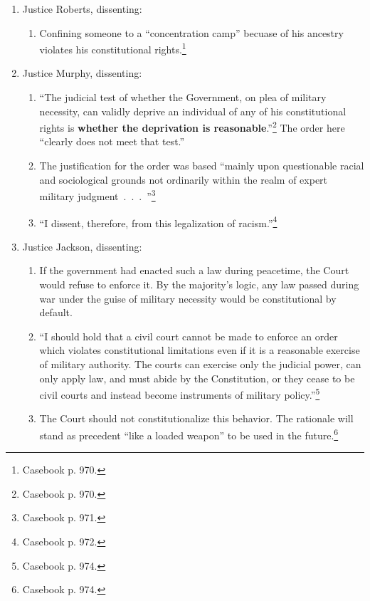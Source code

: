 \begin{enumerate}
    \begin{enumerate}
        \item ``~.~.~.~the validity of action under the war power must be 
        judged wholly in the context of war.''\footnote{Casebook p. 969.}
    \end{enumerate}
    \item Justice Roberts, dissenting:
    \begin{enumerate}
        \item Confining someone to a ``concentration camp'' becuase of his 
        ancestry violates his constitutional rights.\footnote{Casebook p. 
        970.}
    \end{enumerate}
    \item Justice Murphy, dissenting:
    \begin{enumerate}
        \item ``The judicial test of whether the Government, on plea of 
        military necessity, can validly deprive an individual of any of 
        his constitutional rights is \textbf{whether the deprivation is 
        reasonable}.''\footnote{Casebook p. 970.} The order here ``clearly 
        does not meet that test.''
        \item The justification for the order was based ``mainly upon 
        questionable racial and sociological grounds not ordinarily within 
        the realm of expert military judgment~.~.~.~''\footnote{Casebook 
        p. 971.}
        \item ``I dissent, therefore, from this legalization of 
        racism.''\footnote{Casebook p. 972.}
    \end{enumerate}
    \item Justice Jackson, dissenting:
    \begin{enumerate}
        \item If the government had enacted such a law during peacetime, 
        the Court would refuse to enforce it. By the majority's logic, any 
        law passed during war under the guise of military necessity would 
        be constitutional by default.
        \item ``I should hold that a civil court cannot be made to enforce 
        an order which violates constitutional limitations even if it is a 
        reasonable exercise of military authority. The courts can exercise 
        only the judicial power, can only apply law, and must abide by the 
        Constitution, or they cease to be civil courts and instead become 
        instruments of military policy.''\footnote{Casebook p. 974.}
        \item The Court should not constitutionalize this behavior. The 
        rationale will stand as precedent ``like a loaded weapon'' to be used 
        in the future.\footnote{Casebook p. 974.}
    \end{enumerate}
\end{enumerate}

